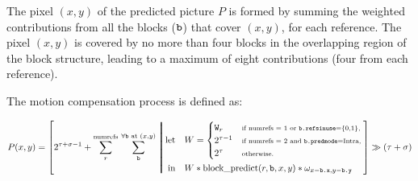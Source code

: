 



The pixel $(x,y)$ of the predicted picture $P$ is formed by summing the
weighted contributions from all the blocks ($\text{\texttt{b}}$) that cover $(x,y)$, for
each reference.  The pixel $(x,y)$ is covered by no more than four
blocks in the overlapping region of the block structure, leading to a
maximum of eight contributions (four from each reference).


The motion compensation process is defined as:

\begin{multline*}
P(x,y) =
 \left[
    2^{\tau+\sigma-1} +
    \displaystyle\sum^{\text{numrefs}}_{r}\, \sum^{\forall \B \text{ at } (x,y)}_{\B}
      \left\bracevert\begin{aligned}
        \text{let}\quad& W = \begin{cases}
                                \W_r &\scriptstyle\text{if numrefs = 1 or } \Brefsinuse = \lbrace0,1\rbrace,\\
                                2^{\tau-1}   &\scriptstyle\text{if numrefs = 2 and } \Bpredmode = \predIntra,\\
                                2^\tau &\scriptstyle\text{otherwise.}
                              \end{cases} \\%
        \text{in}\quad & W*\text{block\_predict}(r,\B,x,y)*\omega_{x-\Bx, y-\By}
        \end{aligned}\right.
 \right]
   \gg (\tau + \sigma)
\end{multline*}



